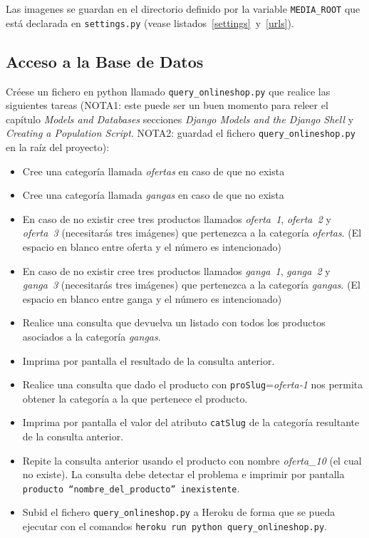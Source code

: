 \documentclass[12pt]{article} %
\newcommand{\ttt}[1]{\texttt{#1}}%
\newcommand{\settings}{\texttt{settings.py}}%
\begin{document}
Las imagenes se guardan en el directorio definido por la variable  \ttt{MEDIA\_ROOT} que está declarada en \settings{} (vease listados~\ref{settings}~y~\ref{urls}).

\subsection{Acceso a la Base de Datos}

Créese un fichero en python llamado \texttt{query\_onlineshop.py} que realice las siguientes tareas (NOTA1: este puede ser un buen momento para releer el capítulo \textit{Models and Databases} secciones \textit{Django Models and the Django Shell} y \textit{Creating a Population Script}. NOTA2: guardad el fichero \texttt{query\_onlineshop.py} en la raíz del proyecto):

\begin{itemize}
    \item Cree una categoría llamada \textit{ofertas} en caso de que no exista 
    \item Cree una categoría llamada \textit{gangas} en caso de que no exista 
    \item En caso de no existir cree tres productos llamados \textit{oferta~1}, \textit{oferta~2} y \textit{oferta~3} (necesitarás tres imágenes) que pertenezca a la categoría \textit{ofertas}. (El espacio en blanco entre oferta y el número es intencionado)
    \item En caso de no existir cree tres productos llamados \textit{ganga~1}, \textit{ganga~2} y \textit{ganga~3} (necesitarás tres imágenes) que pertenezca a la categoría \textit{gangas}. (El espacio en blanco entre ganga y el número es intencionado)
    \item Realice una consulta que devuelva un listado con todos los productos asociados a la categoría \textit{gangas}.
    \item Imprima por pantalla el resultado de la consulta anterior.
    \item Realice una consulta que dado el producto con \texttt{proSlug}=\textit{oferta-1} nos permita obtener la categoría a la que pertenece el producto.
    \item Imprima por pantalla el valor del atributo \texttt{catSlug} de la categoría resultante de la consulta anterior.
    \item Repite la consulta anterior usando el producto con nombre \textit{oferta\_10} (el cual no existe). La consulta debe detectar el problema e imprimir por pantalla \texttt{producto ``nombre\_del\_producto'' inexistente}.
    \item Subid el fichero \texttt{query\_onlineshop.py} a Heroku de forma que se pueda ejecutar con el comandos
    \texttt{heroku run python query\_onlineshop.py}.
    
\end{itemize}
\end{document}
